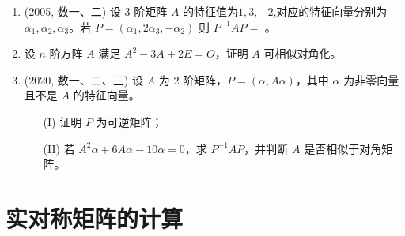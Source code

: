 \documentclass[12pt, a4paper, oneside, UTF8]{ctexbook}
\begin{document}
\begin{enumerate}[label=\arabic*.,start=9]
    \item (2005, 数一、二) 设 3 阶矩阵 $A$ 的特征值为$1, 3, -2$,对应的特征向量分别为 $\alpha_1, \alpha_2, \alpha_3$。若
    $P = (\alpha_1, 2\alpha_3, -\alpha_2)$
    则 $P^{-1}AP = $ \underline{\hspace{3cm}}。
    
    \begin{solution}
    \newpage
    \end{solution}
    
    \item 设 $n$ 阶方阵 $A$ 满足 $A^2 - 3A + 2E = O$，证明 $A$ 可相似对角化。
    
    \begin{solution}
    \newpage
    \end{solution}
    
    \item (2020, 数一、二、三) 设 $A$ 为 2 阶矩阵，$P = (\alpha, A\alpha)$，其中 $\alpha$ 为非零向量且不是 $A$ 的特征向量。
    \begin{enumerate}
        \item [(I)] 证明 $P$ 为可逆矩阵；
        \item [(II)] 若 $A^2\alpha + 6A\alpha - 10\alpha = 0$，求 $P^{-1}AP$，并判断 $A$ 是否相似于对角矩阵。
    \end{enumerate}
    
    \begin{solution}
    \newpage
    \end{solution}
\end{enumerate}

\section{实对称矩阵的计算}
\end{document}
